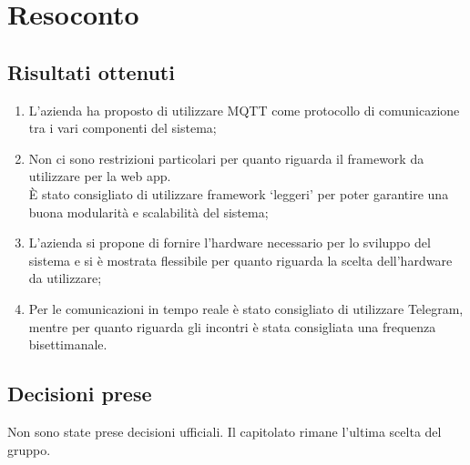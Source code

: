 \section{Resoconto}

\subsection{Risultati ottenuti}
\begin{enumerate}
    \item L'azienda ha proposto di utilizzare MQTT come protocollo di comunicazione tra i vari componenti del sistema;
    \item Non ci sono restrizioni particolari per quanto riguarda il framework da utilizzare per la web app. \\ È stato consigliato di utilizzare framework `leggeri' per poter garantire una buona modularità e scalabilità del sistema;
    \item L'azienda si propone di fornire l'hardware necessario per lo sviluppo del sistema e si è mostrata flessibile per quanto riguarda la scelta dell'hardware da utilizzare;
    \item Per le comunicazioni in tempo reale  è stato consigliato di utilizzare Telegram, mentre per quanto riguarda gli incontri è stata consigliata una frequenza bisettimanale.
\end{enumerate}

\subsection{Decisioni prese}
Non sono state prese decisioni ufficiali. Il capitolato rimane l'ultima scelta del gruppo.
